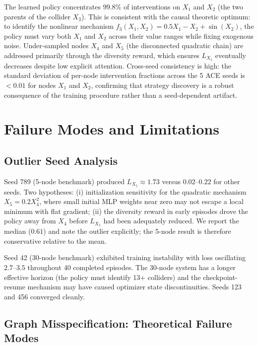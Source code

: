 \documentclass[twoside]{article}
\theoremstyle{plain}
\theoremstyle{definition}
\theoremstyle{remark}
\begin{document}
The learned policy concentrates $99.8\%$ of interventions on $X_1$ and $X_2$ (the two parents of the collider $X_3$). This is consistent with the causal theoretic optimum: to identify the nonlinear mechanism $f_3(X_1, X_2) = 0.5 X_1 - X_2 + \sin(X_2)$, the policy must vary both $X_1$ and $X_2$ across their value ranges while fixing exogenous noise. Under-sampled nodes $X_4$ and $X_5$ (the disconnected quadratic chain) are addressed primarily through the diversity reward, which ensures $L_{X_5}$ eventually decreases despite low explicit attention. Cross-seed consistency is high: the standard deviation of per-node intervention fractions across the 5 ACE seeds is $<0.01$ for nodes $X_1$ and $X_2$, confirming that strategy discovery is a robust consequence of the training procedure rather than a seed-dependent artifact.

\section{Failure Modes and Limitations}
\label{app:failures}

\subsection{Outlier Seed Analysis}
\label{app:outlier}

Seed 789 (5-node benchmark) produced $L_{X_5} \approx 1.73$ versus $0.02$--$0.22$ for other seeds. Two hypotheses: (i) initialization sensitivity for the quadratic mechanism $X_5 = 0.2 X_4^2$, where small initial MLP weights near zero may not escape a local minimum with flat gradient; (ii) the diversity reward in early episodes drove the policy away from $X_4$ before $L_{X_5}$ had been adequately reduced. We report the median ($0.61$) and note the outlier explicitly; the 5-node result is therefore conservative relative to the mean.

Seed 42 (30-node benchmark) exhibited training instability with loss oscillating $2.7$--$3.5$ throughout 40 completed episodes. The 30-node system has a longer effective horizon (the policy must identify 13+ colliders) and the checkpoint-resume mechanism may have caused optimizer state discontinuities. Seeds 123 and 456 converged cleanly.

\subsection{Graph Misspecification: Theoretical Failure Modes}
\label{app:misspec-failures}
\end{document}
